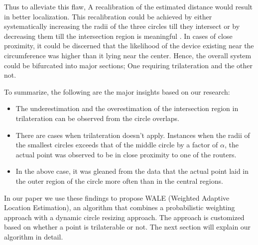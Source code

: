 \documentclass[twocolumn, 11pt]{IEEEtran}
\begin{document}
Thus to alleviate this flaw, A recalibration of the estimated distance would result in better localization. This recalibration could be achieved by either systematically increasing the radii of the three circles till they intersect or by decreasing them till the intersection region is meaningful \cite{DCE}. %
In cases of close proximity, it could be discerned that the likelihood of the device existing near the circumference was higher than it lying near the center. Hence, the overall system could be bifurcated into major sections; One requiring trilateration and the other not.



To summarize, the following are the major insights based on our research:
\begin{itemize}
    \item The underestimation and the overestimation of the intersection region in trilateration can be observed from the circle overlaps.
    \item There are cases when trilateration doesn't apply. Instances when the radii of the smallest circles exceeds that of the middle circle by a factor of \(\alpha\), the actual point was observed to be in close proximity to one of the routers. %
    \item In the above case, it was gleaned from the data that the actual point laid in the outer region of the circle more often than in the central regions. 
\end{itemize}



In our paper we use these findings to propose WALE (Weighted Adaptive Location Estimation), an algorithm that combines a probabilistic weighting approach with a dynamic circle resizing approach. The approach is customized based on whether a point is trilaterable or not. The next section will explain our algorithm in detail. 
\end{document}
